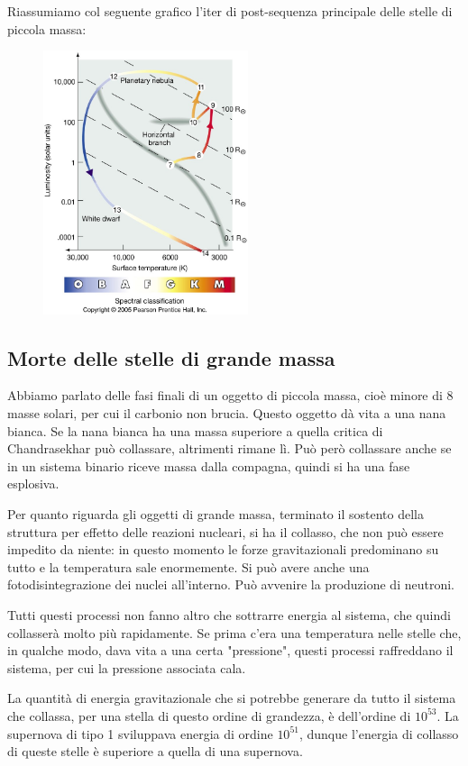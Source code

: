 Riassumiamo col seguente grafico l'iter di post-sequenza principale delle stelle di piccola massa:

\begin{figure}[H]
    \centering
    \includegraphics[width=6cm]{lezione 28 novembre/mortestellepiccolamassa.jpg}
    \label{lezione 28 novembre/mortestellepiccolamassa.jpg}
\end{figure}

\subsection{Morte delle stelle di grande massa}
Abbiamo parlato delle fasi finali di un oggetto di piccola massa, cioè minore di 8 masse solari, per cui il carbonio non brucia. Questo oggetto dà vita a una nana bianca. Se la nana bianca ha una massa superiore a quella critica di Chandrasekhar può collassare, altrimenti rimane lì. Può però collassare anche se in un sistema binario riceve massa dalla compagna, quindi si ha una fase esplosiva.

Per quanto riguarda gli oggetti di grande massa, terminato il sostento della struttura per effetto delle reazioni nucleari, si ha il collasso, che non può essere impedito da niente: in questo momento le forze gravitazionali predominano su tutto e la temperatura sale enormemente. Si può avere anche una fotodisintegrazione dei nuclei all'interno. Può avvenire la produzione di neutroni.

Tutti questi processi non fanno altro che sottrarre energia al sistema, che quindi collasserà molto più rapidamente. Se prima c'era una temperatura nelle stelle che, in qualche modo, dava vita a una certa "pressione", questi processi raffreddano il sistema, per cui la pressione associata cala.

La quantità di energia gravitazionale che si potrebbe generare da tutto il sistema che collassa, per una stella di questo ordine di grandezza, è dell'ordine di $10^{53}$. La supernova di tipo 1 sviluppava energia di ordine $10^{51}$, dunque l'energia di collasso di queste stelle è superiore a quella di una supernova.

